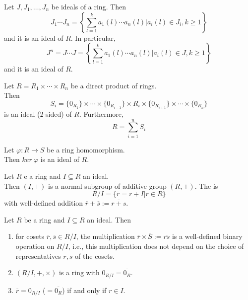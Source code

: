 \begin{proposition}
Let $J, J_1, \ldots, J_n$ be ideals of a ring. Then
\begin{equation}
J_1 \cdots J_n = \left\{ \sum_{l=1}^{k} a_1(l) \cdots a_n(l) | a_i(l) \in J_i, k \geq 1 \right\} \nonumber
\end{equation}
and it is an ideal of $R$. In particular, 
\begin{equation}
J^n = J \cdots J = \left\{ \sum_{l=1}^{k} a_1(l) \cdots a_n(l) | a_i(l) \in J, k \geq 1 \right\} \nonumber
\end{equation}
and it is an ideal of $R$.\\
\end{proposition}


\begin{proposition}
Let $R = R_1 \times \cdots \times R_n$ be a direct product of rings.\\
Then 
\begin{equation}
S_i = \{0_{R_1}\} \times \cdots \times \{0_{R_{i-1}}\} \times R_i \times \{0_{R_{i+1}}\} \times \cdots \times \{0_{R_n}\} \nonumber
\end{equation}
is an ideal (2-sided) of $R$. Furthermore,
\begin{equation}
R = \sum_{i=1}^{n} S_i \nonumber
\end{equation}
\end{proposition}


\begin{proposition}
Let $\varphi: R \rightarrow S$ be a ring homomorphism.\\
Then $ker \ \varphi$ is an ideal of $R$.\\
\end{proposition}


\begin{definition}
Let $R$ e a ring and $I \subseteq R$ an ideal.\\
Then $(I, +)$ is a normal subgroup of additive group $(R, +)$. The  is
\begin{equation}
R/I = \{\overline{r} = r + I | r \in R\} \nonumber
\end{equation}
with well-defined addition $\overline{r} + \overline{s} := \overline{r+s}$.\\
\end{definition}


\begin{theorem}
Let $R$ be a ring and $I \subseteq R$ an ideal. Then
\begin{enumerate}[label=(\roman*)]
\item for cosets $\overline{r}, \overline{s} \in R/I$, the multiplication $\overline{r} \times \overline{S} := \overline{rs}$ is a well-defined binary operation on $R/I$, i.e., this multiplication does not depend on the choice of representatives $r, s$ of the cosets.
\item $(R/I, +, \times)$ is a ring with $0_{R/I} = \overline{0_R}$.
\item $\overline{r} = 0_{R/I}$ ($=\overline{0_R}$) if and only if $r \in I$.
\end{enumerate}
\end{theorem}


